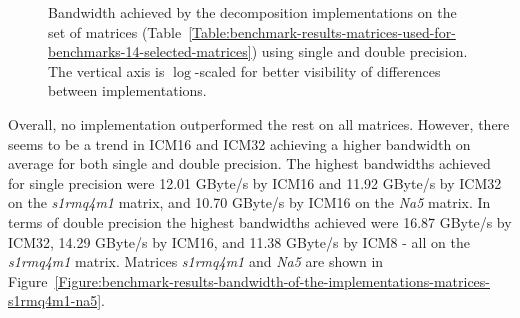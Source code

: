 \begin{figure}[h!]
\begin{subfigure}{\textwidth}
	\end{subfigure}
	\caption{Bandwidth achieved by the decomposition implementations on the set of matrices (Table~\ref{Table:benchmark-results-matrices-used-for-benchmarks-14-selected-matrices}) using single and double precision. The vertical axis is $ \log $-scaled for better visibility of differences between implementations.}
	\label{Graph:benchmark-results-bandwidth-of-the-implementations-single-double-precision}
\end{figure}

Overall, no implementation outperformed the rest on all matrices. However, there seems to be a trend in ICM16 and ICM32 achieving a higher bandwidth on average for both single and double precision. The highest bandwidths achieved for single precision were 12.01 GByte/s by ICM16 and 11.92 GByte/s by ICM32 on the \textit{s1rmq4m1} matrix, and 10.70 GByte/s by ICM16 on the \textit{Na5} matrix. In terms of double precision the highest bandwidths achieved were 16.87 GByte/s by ICM32, 14.29 GByte/s by ICM16, and 11.38 GByte/s by ICM8 - all on the \textit{s1rmq4m1} matrix. Matrices \textit{s1rmq4m1} and \textit{Na5} are shown in Figure~\ref{Figure:benchmark-results-bandwidth-of-the-implementations-matrices-s1rmq4m1-na5}.

